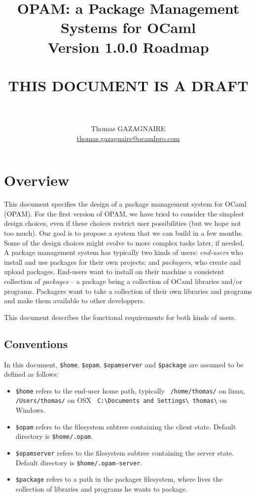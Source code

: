 \documentclass[a4paper,11pt]{article}
\title{
OPAM: a Package Management Systems for OCaml\\
Version 1.0.0 Roadmap\\ ~\ \\
THIS DOCUMENT IS A DRAFT\\
~\ \\}
\author{Thomas GAZAGNAIRE\\
\url{thomas.gazagnaire@ocamlpro.com}\\
}
\begin{document}
\maketitle

\vfill

\tableofcontents

\section*{Overview}

This document specifies the design of a package management system for
OCaml (OPAM). For the first version of OPAM, we have tried to consider
the simplest design choices, even if these choices restrict user
possibilities (but we hope not too much). Our goal is to propose a
system that we can build in a few months. Some of the design choices
might evolve to more complex tasks later, if needed. \\

A package management system has typically two kinds of users: {\em
  end-users} who install and use packages for their own projects; and
{\em packagers}, who create and upload packages. End-users want to
install on their machine a consistent collection of {\em packages} --
a package being a collection of OCaml libraries and/or programs.
Packagers want to take a collection of their own libraries and
programs and make them available to other developpers.

This document describes the fonctional requirements for both kinds of
users.

\subsection*{Conventions}

In this document, {\tt \$home}, {\tt \$opam}, {\tt \$opamserver} and
{\tt \$package} are assumed to be defined as follows:

\begin{itemize}

\item {\tt \$home} refers to the end-user home path, typically {\tt
  /home/thomas/} on linux, {\tt /Users/thomas/} on OSX {\tt
  C:\textbackslash Documents and Settings\textbackslash
  thomas\textbackslash} on Windows.

\item {\tt \$opam} refers to the filesystem subtree containing the
  client state. Default directory is {\tt \$home/.opam}.

\item {\tt \$opamserver} refers to the filesystem subtree containing
  the server state. Default directory is {\tt \$home/.opam-server}.

\item {\tt \$package} refers to a path in the packager filesystem, where
  lives the collection of libraries and programs he wants to package.

\end{itemize}
\end{document}
